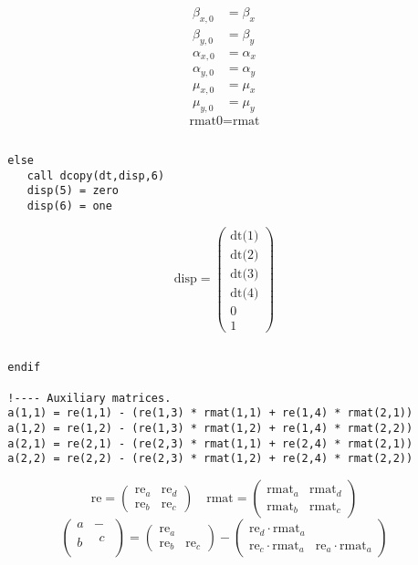 \documentclass{cern-art} %
\begin{document}
\[
\begin{aligned}\beta_{x,0} & =\beta_{x}\\
\beta_{y,0} & =\beta_{y}\\
\alpha_{x,0} & =\alpha_{x}\\
\alpha_{y,0} & =\alpha_{y}\\
\mu_{x,0} & =\mu_{x}\\
\mu_{y,0} & =\mu_{y}
\end{aligned}
\]
\[
\text{rmat0}=\text{rmat}
\]

\begin{lstlisting}[firstnumber=last]

  else
     call dcopy(dt,disp,6)
     disp(5) = zero
     disp(6) = one
\end{lstlisting}

\[
\text{disp}=\left(\begin{array}{c}
\text{dt(1)}\\
\text{dt(2)}\\
\text{dt(3)}\\
\text{dt(4)}\\
0\\
1
\end{array}\right)
\]

\begin{lstlisting}[firstnumber=last]

  endif

  !---- Auxiliary matrices.
  a(1,1) = re(1,1) - (re(1,3) * rmat(1,1) + re(1,4) * rmat(2,1))
  a(1,2) = re(1,2) - (re(1,3) * rmat(1,2) + re(1,4) * rmat(2,2))
  a(2,1) = re(2,1) - (re(2,3) * rmat(1,1) + re(2,4) * rmat(2,1))
  a(2,2) = re(2,2) - (re(2,3) * rmat(1,2) + re(2,4) * rmat(2,2))
\end{lstlisting}

\[
\text{re}=\left(\begin{array}{cc}
\text{re}_{a} & \text{re}_{d}\\
\text{re}_{b} & \text{re}_{c}
\end{array}\right)\quad\text{rmat}=\left(\begin{array}{cc}
\text{rmat}_{a} & \text{rmat}_{d}\\
\text{rmat}_{b} & \text{rmat}_{c}
\end{array}\right)
\]
\[
\left(\begin{array}{cc}
a & -\\
b & \begin{array}{cc}
c\\
\\
\end{array}
\end{array}\right)=\left(\begin{array}{cc}
\text{re}_{a}\\
\text{re}_{b} & \text{re}_{c}
\end{array}\right)-\left(\begin{array}{cc}
\text{re}_{d}\cdot\text{rmat}_{a}\\
\text{re}_{c}\cdot\text{rmat}_{a} & \text{re}_{a}\cdot\text{rmat}_{a}
\end{array}\right)
\]
\end{document}
